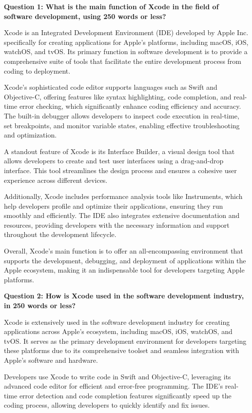 \documentclass[a4paper, 11pt]{report}
\begin{document}
\textbf{Question 1: What is the main function of Xcode in the field of software development, using 250 words or less?}

Xcode is an Integrated Development Environment (IDE) developed by Apple Inc. specifically for creating applications for Apple's platforms, including macOS, iOS, watchOS, and tvOS. Its primary function in software development is to provide a comprehensive suite of tools that facilitate the entire development process from coding to deployment.

Xcode's sophisticated code editor supports languages such as Swift and Objective-C, offering features like syntax highlighting, code completion, and real-time error checking, which significantly enhance coding efficiency and accuracy. The built-in debugger allows developers to inspect code execution in real-time, set breakpoints, and monitor variable states, enabling effective troubleshooting and optimization.

A standout feature of Xcode is its Interface Builder, a visual design tool that allows developers to create and test user interfaces using a drag-and-drop interface. This tool streamlines the design process and ensures a cohesive user experience across different devices.

Additionally, Xcode includes performance analysis tools like Instruments, which help developers profile and optimize their applications, ensuring they run smoothly and efficiently. The IDE also integrates extensive documentation and resources, providing developers with the necessary information and support throughout the development lifecycle.

Overall, Xcode's main function is to offer an all-encompassing environment that supports the development, debugging, and deployment of applications within the Apple ecosystem, making it an indispensable tool for developers targeting Apple platforms.
\vspace{\baselineskip}

\textbf{Question 2: How is Xcode used in the software development industry, in 250 words or less?}

Xcode is extensively used in the software development industry for creating applications across Apple’s ecosystem, including macOS, iOS, watchOS, and tvOS. It serves as the primary development environment for developers targeting these platforms due to its comprehensive toolset and seamless integration with Apple’s software and hardware.

Developers use Xcode to write code in Swift and Objective-C, leveraging its advanced code editor for efficient and error-free programming. The IDE’s real-time error detection and code completion features significantly speed up the coding process, allowing developers to quickly identify and fix issues.
\end{document}
